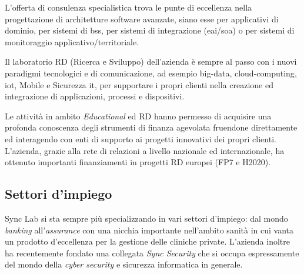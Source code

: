 L'offerta di consulenza specialistica trova le punte di eccellenza nella progettazione di
architetture software avanzate, siano esse per applicativi di dominio, per sistemi di
\gls{bss}, per sistemi di integrazione (\acrshort{eai}/\acrshort{soa}) o per sistemi di
monitoraggio applicativo/territoriale.

Il laboratorio RD (Ricerca e Sviluppo) dell'azienda è sempre al passo con i nuovi
paradigmi tecnologici e di comunicazione, ad esempio \gls{big-data}\gloss, \gls{cloud-computing}\gloss,
\gls{iot}\gloss, Mobile e Sicurezza \acrshort{it}, per supportare i propri clienti nella creazione
ed integrazione di applicazioni, processi e dispositivi.

Le attività in ambito \textit{Educational} ed RD hanno permesso di acquisire una profonda
conoscenza degli strumenti di finanza agevolata fruendone direttamente ed interagendo
con enti di supporto ai progetti innovativi dei propri clienti. L'azienda, grazie alla rete
di relazioni a livello nazionale ed internazionale, ha ottenuto importanti finanziamenti
in progetti RD europei (FP7 e H2020).

\subsection{Settori d'impiego}

Sync Lab si sta sempre più specializzando in vari settori d'impiego: dal mondo \textit{banking}
all'\textit{assurance} con una nicchia importante nell'ambito sanità in cui vanta un prodotto
d'eccellenza per la gestione delle cliniche private.
L'azienda inoltre ha recentemente fondato una collegata \textit{Sync Security} che si occupa
espressamente del mondo della \textit{cyber security} e sicurezza informatica in generale.

